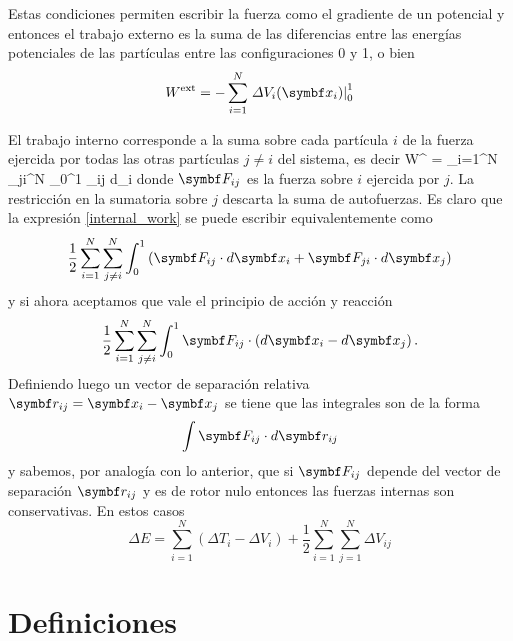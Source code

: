 \documentclass[10pt,oneside]{CBFT_book}
\begin{document}
Estas condiciones permiten escribir la fuerza como el gradiente de un potencial y entonces el trabajo externo es la 
suma de las diferencias entre las energías potenciales de las partículas entre las configuraciones 0 y 1, o bien
\[
	W^{\text{ext}} = - \sum_{i=1}^N \left. \Delta V_i(\vb{x}_i) \right|_0^1
\]

El trabajo interno corresponde a la suma sobre cada partícula $i$ de la fuerza ejercida por todas las otras partículas 
$j \neq i$ del sistema, es decir
\be
	W^{} = \sum_{i=1}^N \sum_{j\neq i}^N \int_0^1 _{ij} \cdot d_i
	\label{internal_work}
\ee
donde $\vb{F}_{ij} $ es la fuerza sobre $i$ ejercida por $j$. La restricción en la sumatoria sobre $j$ descarta la suma 
de autofuerzas. Es claro que la expresión \eqref{internal_work} se puede escribir equivalentemente como
\[
	\frac{1}{2} \sum_{i=1}^N \sum_{j\neq i}^N \int_0^1 
	\left( \vb{F}_{ij} \cdot d\vb{x}_i + \vb{F}_{ji} \cdot d\vb{x}_j \right) 
\]
%
y si ahora aceptamos que vale el principio de acción y reacción
\[
	\frac{1}{2} \sum_{i=1}^N \sum_{j\neq i}^N \int_0^1 
	\vb{F}_{ij} \cdot \left(d\vb{x}_i - d\vb{x}_j \right) .
\]
Definiendo luego un vector de separación relativa $ \vb{r}_{ij} = \vb{x}_i - \vb{x}_j $ se tiene que las integrales son 
de la forma 
\[
	\int \vb{F}_{ij} \cdot d\vb{r}_{ij}
\]
y sabemos, por analogía con lo anterior, que si $\vb{F}_{ij}$ depende del vector de separación $ \vb{r}_{ij} $ y es de 
rotor nulo entonces las fuerzas internas son conservativas.
En estos casos
\[
	\Delta E = \sum_{i=1}^N ( \Delta T_i - \Delta V_i ) + \frac{1}{2} \sum_{i=1}^N \sum_{j=1}^N \Delta V_{ij}
\]


\section{Definiciones}
\end{document}
